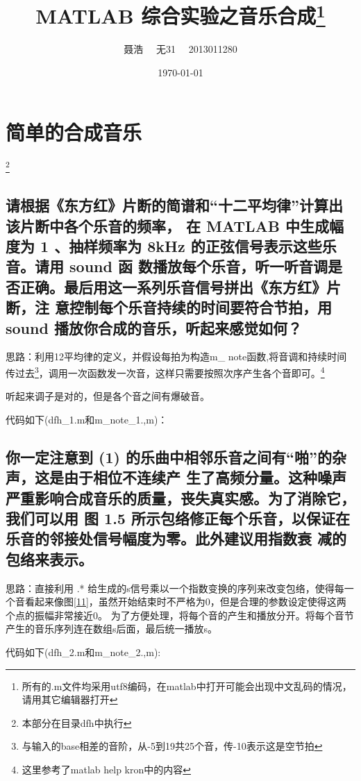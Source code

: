 \documentclass{ctexart}
\title{MATLAB 综合实验之音乐合成\footnote{所有的.m文件均采用utf8编码，在matlab中打开可能会出现中文乱码的情况，请用其它编辑器打开}}
\author{聂浩~~ 无31~~ 2013011280}
\date{\today}
\begin{document}
\maketitle
\section{简单的合成音乐}
\footnote{本部分在目录dfh中执行}
    \subsection{请根据《东方红》片断的简谱和“十二平均律”计算出该片断中各个乐音的频率，
            在 MATLAB 中生成幅度为 1 、抽样频率为 8kHz 的正弦信号表示这些乐音。请用 sound 函
            数播放每个乐音，听一听音调是否正确。最后用这一系列乐音信号拼出《东方红》片断，注
        意控制每个乐音持续的时间要符合节拍，用 sound 播放你合成的音乐，听起来感觉如何？}

        思路：利用12平均律的定义，并假设每拍为构造m\_ note函数,将音调和持续时间传过去\footnote{与输入的base相差的音阶，从-5到19共25个音，传-10表示这是空节拍}，调用一次函数发一次音，这样只需要按照次序产生各个音即可。\footnote{这里参考了matlab help kron中的内容}

        听起来调子是对的，但是各个音之间有爆破音。

        代码如下(dfh\_1.m和m\_note\_1.,m)：

        
        

    \subsection{
            你一定注意到 (1) 的乐曲中相邻乐音之间有“啪”的杂声，这是由于相位不连续产
            生了高频分量。这种噪声严重影响合成音乐的质量，丧失真实感。为了消除它，我们可以用
            图 1.5 所示包络修正每个乐音，以保证在乐音的邻接处信号幅度为零。此外建议用指数衰
            减的包络来表示。
        }

        思路：直接利用 .* 给生成的s信号乘以一个指数变换的序列来改变包络，使得每一个音看起来像图\ref{11}，虽然开始结束时不严格为0，但是合理的参数设定使得这两个点的振幅非常接近0。
        为了方便处理，将每个音的产生和播放分开。将每个音节产生的音乐序列连在数组s后面，最后统一播放s。
        
        代码如下(dfh\_2.m和m\_note\_2.,m):

        
        
\end{document}
